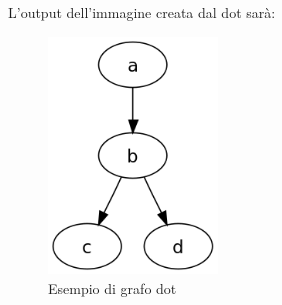 L'output dell'immagine creata dal dot sarà:
\begin{figure}[H]
	\centering
	\includegraphics[width=0.4\textwidth]{img/220px-DotLanguageDirected.png}
	\caption{Esempio di grafo dot}
\end{figure}
